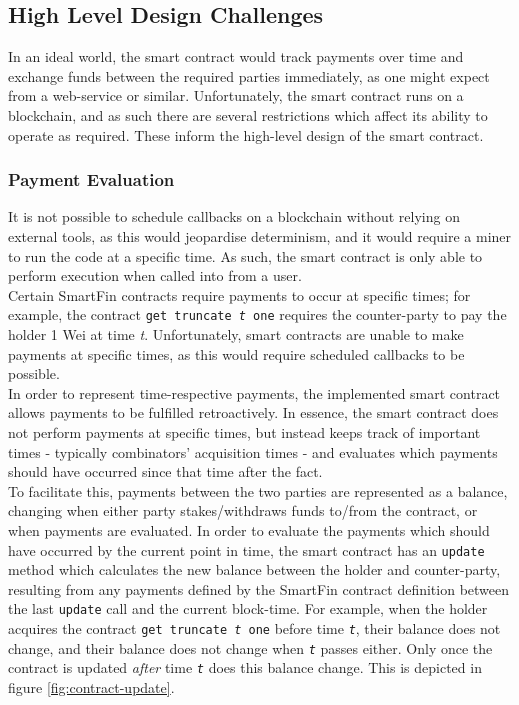 \subsection{High Level Design Challenges}

In an ideal world, the smart contract would track payments over time and exchange funds between the required parties immediately, as one might expect from a web-service or similar. Unfortunately, the smart contract runs on a blockchain, and as such there are several restrictions which affect its ability to operate as required. These inform the high-level design of the smart contract.

\subsubsection{Payment Evaluation}

It is not possible to schedule callbacks on a blockchain without relying on external tools, as this would jeopardise determinism, and it would require a miner to run the code at a specific time. As such, the smart contract is only able to perform execution when called into from a user. \\

Certain SmartFin contracts require payments to occur at specific times; for example, the contract \texttt{get truncate \textit{t} one} requires the counter-party to pay the holder 1 Wei at time \textit{t}. Unfortunately, smart contracts are unable to make payments at specific times, as this would require scheduled callbacks to be possible. \\

In order to represent time-respective payments, the implemented smart contract allows payments to be fulfilled retroactively. In essence, the smart contract does not perform payments at specific times, but instead keeps track of important times - typically combinators' acquisition times - and evaluates which payments should have occurred since that time after the fact. \\

To facilitate this, payments between the two parties are represented as a balance, changing when either party stakes/withdraws funds to/from the contract, or when payments are evaluated. In order to evaluate the payments which should have occurred by the current point in time, the smart contract has an \texttt{update} method which calculates the new balance between the holder and counter-party, resulting from any payments defined by the SmartFin contract definition between the last \texttt{update} call and the current block-time. For example, when the holder acquires the contract \texttt{get truncate \textit{t} one} before time \texttt{\textit{t}}, their balance does not change, and their balance does not change when \texttt{\textit{t}} passes either. Only once the contract is updated \textit{after} time \texttt{\textit{t}} does this balance change. This is depicted in figure \ref{fig:contract-update}. \\

